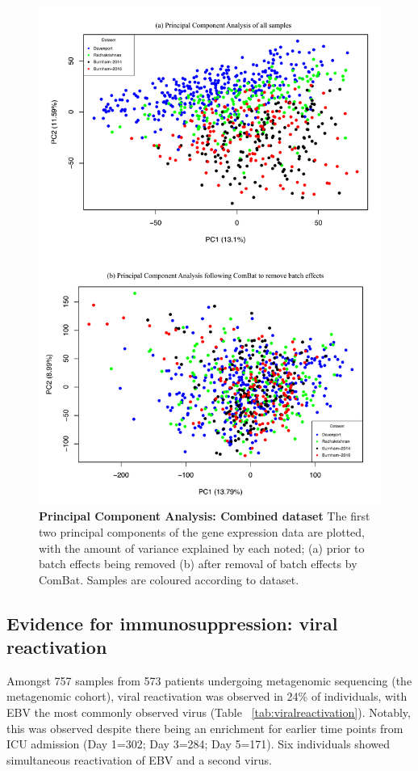 \FloatBarrier
\begin{figure}[htbp]
\centering
\includegraphics[scale=0.7]{./Results3/Images/PCA_alldata.pdf}
\caption[Principal Component Analysis: Combined dataset]{\textbf{Principal Component Analysis: Combined dataset} The first two principal components of the gene expression data are plotted, with the amount of variance explained by each noted; (a) prior to batch effects being removed (b) after removal of batch effects by ComBat. Samples are coloured according to dataset.}
\label{fig:combat}
\end{figure}

\subsection{Evidence for immunosuppression: viral reactivation}
Amongst 757 samples from 573 patients undergoing metagenomic sequencing (the metagenomic cohort), viral reactivation was observed in 24\% of individuals, with EBV the most commonly observed virus (Table ~\ref{tab:viralreactivation}). Notably, this was observed despite there being an enrichment for earlier time points from ICU admission (Day 1=302; Day 3=284; Day 5=171). Six individuals showed simultaneous reactivation of EBV and a second virus. 

